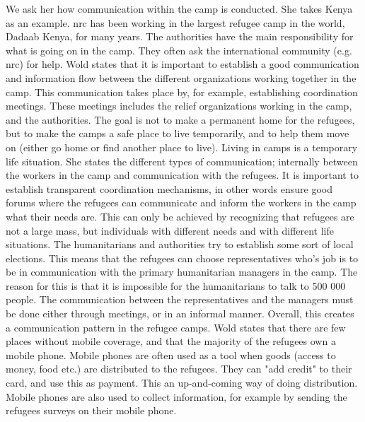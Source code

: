 We ask her how communication within the camp is conducted. She takes Kenya as an example. \gls{nrc} has been working in the largest refugee camp in the world, Dadaab Kenya, for many years. The authorities have the main responsibility for what is going on in the camp. They often ask the international community (e.g. \gls{nrc}) for help. Wold states that it is important to establish a good communication and information flow between the different organizations working together in the camp. This communication takes place by, for example, establishing coordination meetings. These meetings includes the relief organizations working in the camp, and the authorities. The goal is not to make a permanent home for the refugees, but to make the camps a safe place to live temporarily, and to help them move on (either go home or find another place to live). Living in camps is a temporary life situation. She states the different types of communication; internally between the workers in the camp and communication with the refugees. It is important to establish transparent coordination mechanisms, in other words ensure good forums where the refugees can communicate and inform the workers in the camp what their needs are. This can only be achieved by recognizing that refugees are not a large mass, but individuals with different needs and with different life situations. The humanitarians and authorities try to establish some sort of local elections. This means that the refugees can choose representatives who's job is to be in communication with the primary humanitarian managers in the camp. The reason for this is that it is impossible for the humanitarians to talk to 500 000 people. The communication between the representatives and the managers must be done either through meetings, or in an informal manner. Overall, this creates a communication pattern in the refugee camps. Wold states that there are few places without mobile coverage, and that the majority of the refugees own a mobile phone. Mobile phones are often used as a tool when goods (access to money, food etc.) are distributed to the refugees. They can "add credit" to their card, and use this as payment. This an up-and-coming way of doing distribution. Mobile phones are also used to collect information, for example by sending the refugees surveys on their mobile phone. 


